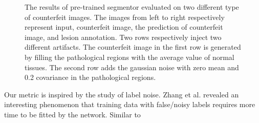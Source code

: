 \documentclass[journal,twoside,web]{ieeecolor}
\begin{document}
\begin{figure}
	\centering
	\caption{The results of pre-trained segmentor evaluated on two different type of counterfeit images. The images from left to right respectively represent input, counterfeit image, the prediction of counterfeit image, and lesion annotation. Two rows respectively inject two different artifacts. The counterfeit image in the first row is generated by filling the pathological regions with the average value of normal tissues. The second row adds the gaussian noise with zero mean and 0.2 covariance in the pathological regions.}\label{fig6}
\end{figure}

Our metric is inspired by the study of label noise. Zhang et al. \cite{zhang2016understanding} revealed an interesting phenomenon that training data with false/noisy labels requires more time to be fitted by the network. Similar to 
\end{document}
